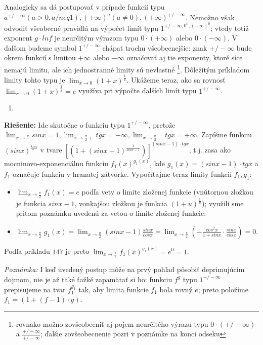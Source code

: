 Analogicky sa dá postupovať v prípade funkcií typu $a^{+/- \infty}(a>0,a /neq 1),(+\infty)^a(a \neq 0),(+\infty)^{+/- \infty}$. Nemožno však odvodiť všeobecné pravidlá na výpočet limít typu $1^{+/- \infty,0^0,(+\infty)^0}$; vtedy totiž exponent $g \cdot ln f$ je neurčitým výrazom typu $0 \cdot (+\infty)$ alebo $0 \cdot (-\infty)$.
V ďalšom budeme symbol $1^{+/- \infty}$ chápať trochu všeobecnejšie: znak $+/- \infty$ bude okrem funkcií s limitou $+\infty$ alebo $-\infty$ označovať aj tie exponenty, ktoré síce nemajú limitu, ale ich jednostranné limity sú nevlastné \footnote{rovnako možno zovšeobecniť aj pojem neurčitého výrazu typu $0 \cdot (+/- \infty)$ a $\frac{+/- \infty}{+/- \infty}$; ďalšie zovšeobecnenie pozri v poznámke na konci odseku}. Dôležitým príkladom limity tohto typu je $\lim_{x \rightarrow 0} (1+x)^{\frac{1}{x}}$. Ukážeme teraz, ako sa rovnosť $\lim_{x \rightarrow 0} (1+x)^{\frac{1}{x}}=e$ využíva pri výpočte ďalších limít typu $1^{+/- \infty}$. 

\begin{enumerate}[resume]
	\item {}
\end{enumerate}

\textbf{Riešenie:}
Ide skutočne o funkciu typu $1^{+/- \infty}$, pretože $\lim_{x \rightarrow \frac{\pi}{}} sin x=1,\lim_{x \rightarrow \frac{\pi}{2}+} tg x=-\infty,\lim_{x \rightarrow \frac{\pi}{2}-} tg x=+\infty$. Zapíšme funkciu $(sin x)^{tg x}$ v tvare $[(1+(sin x-1)^{\frac{1}{sin x-1}})]^{(sin x-1)\cdot tg x}$, t.j. zasa ako mocninovo-exponenciálnu funkciu $f_1(x)^{g_1(x)}$, kde $g_1(x)=(sin x-1)\cdot tg x$ a $f_1$ označuje funkciu v hranatej zátvorke. Vypočítajme teraz limity funkcií $f_1, g_1$:
\begin{itemize}
\item $\lim_{x \rightarrow \frac{\pi}{2}} f_1(x)=e$ podľa vety o limite zloženej funkcie (vnútornou zložkou je funkcia $sin x-1$, vonkajšou zložkou je funkcia $(1+u)^{\frac{1}{u}}$); využili sme pritom poznámku uvedenú za vetou o limite zloženej funkcie:
\item $\lim_{x \rightarrow \frac{\pi}{2}}g_1(x)=\lim_{x \rightarrow \frac{\pi}{2}} (sin x-1)\frac{sin x}{cos x}=\lim_{x \rightarrow \frac{\pi}{2}} (-\frac{cos ^2 x}{1+sin x}\cdot \frac{sin x}{cos x})=0$.
\end{itemize}
Podľa príkladu $147$ je preto $\lim_{x \rightarrow \frac{\pi}{2}} f_1(x)^{g_1(x)}=e^0=1$.

\textit{Poznámka:}
I keď uvedený postup môže na prvý pohľad pôsobiť deprimujúcim dojmom, nie je až také ťažké zapamätať si ho: funkciu $f^g$ typu $1^{+/- \infty}$ prepisujeme na tvar $f_1^{g_1}$ tak, aby limita funkcie $f_1$ bola rovný $e$; preto položíme $f_1=(1+(f-1)\cdot g)$.

